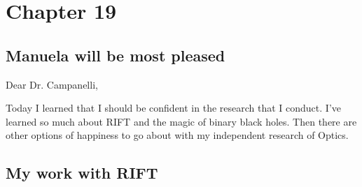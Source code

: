 \chapter{Chapter 19}
\section{Manuela will be most pleased}

Dear Dr. Campanelli, 

Today I learned that I should be confident in the research that I conduct. I've learned so much about RIFT and the magic of binary black holes. Then there are other options of happiness to go about with my independent research of Optics. 
\section{My work with RIFT}